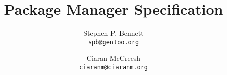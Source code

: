 \documentclass[a4paper,12pt]{report}
\title{Package Manager Specification}
\author{Stephen P. Bennett\\\texttt{spb@gentoo.org}
\and Ciaran McCreesh\\\texttt{ciaranm@ciaranm.org}}
\begin{document}
\maketitle

\tableofcontents
\listofalgorithms
\lstlistoflistings




























\end{document}

